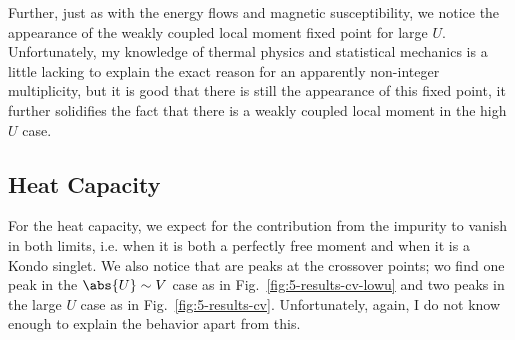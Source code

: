 Further, just as with the energy flows and magnetic susceptibility, we notice the appearance of the weakly coupled local moment fixed point for large $U$. Unfortunately, my knowledge of thermal physics and statistical mechanics is a little lacking to explain the exact reason for an apparently non-integer multiplicity, but it is good that there is still the appearance of this fixed point, it further solidifies the fact that there is a weakly coupled local moment in the high $U$ case.

\subsection{Heat Capacity}

For the heat capacity, we expect for the contribution from the impurity to vanish in both limits, i.e. when it is both a perfectly free moment and when it is a Kondo singlet. We also notice that are peaks at the crossover points; wo find one peak in the $\abs{U} \sim V$ case as in Fig.~\ref{fig:5-results-cv-lowu} and two peaks in the large $U$ case as in Fig.~\ref{fig:5-results-cv}. Unfortunately, again, I do not know enough to explain the behavior apart from this.

